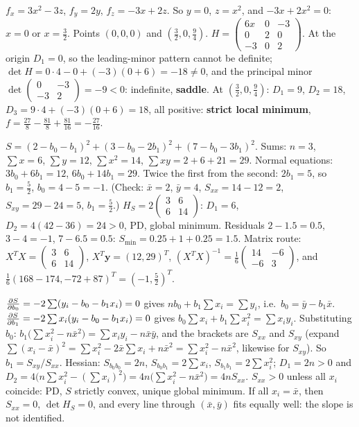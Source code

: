 \begin{solutions}
    \item $f_x = 3 x^2 - 3 z$, $f_y = 2 y$, $f_z = -3 x + 2 z$. So $y = 0$, $z = x^2$, and $-3 x + 2 x^2 = 0$: $x = 0$ or $x = \tfrac32$. Points $(0, 0, 0)$ and $(\tfrac32, 0, \tfrac94)$. $H = \begin{pmatrix} 6 x & 0 & -3 \\ 0 & 2 & 0 \\ -3 & 0 & 2 \end{pmatrix}$. At the origin $D_1 = 0$, so the leading-minor pattern cannot be definite; $\det H = 0 \cdot 4 - 0 + (-3)(0 + 6) = -18 \ne 0$, and the principal minor $\det \begin{pmatrix} 0 & -3 \\ -3 & 2 \end{pmatrix} = -9 < 0$: indefinite, \textbf{saddle}. At $(\tfrac32, 0, \tfrac94)$: $D_1 = 9$, $D_2 = 18$, $D_3 = 9 \cdot 4 + (-3)(0 + 6) = 18$, all positive: \textbf{strict local minimum}, $f = \tfrac{27}{8} - \tfrac{81}{8} + \tfrac{81}{16} = -\tfrac{27}{16}$.
    \item $S = (2 - b_0 - b_1)^2 + (3 - b_0 - 2 b_1)^2 + (7 - b_0 - 3 b_1)^2$. Sums: $n = 3$, $\sum x = 6$, $\sum y = 12$, $\sum x^2 = 14$, $\sum x y = 2 + 6 + 21 = 29$. Normal equations: $3 b_0 + 6 b_1 = 12$, $6 b_0 + 14 b_1 = 29$. Twice the first from the second: $2 b_1 = 5$, so $b_1 = \tfrac52$, $b_0 = 4 - 5 = -1$. (Check: $\bar x = 2$, $\bar y = 4$, $S_{xx} = 14 - 12 = 2$, $S_{xy} = 29 - 24 = 5$, $b_1 = \tfrac52$.) $H_S = 2 \begin{pmatrix} 3 & 6 \\ 6 & 14 \end{pmatrix}$: $D_1 = 6$, $D_2 = 4 (42 - 36) = 24 > 0$, PD, global minimum. Residuals $2 - 1.5 = 0.5$, $3 - 4 = -1$, $7 - 6.5 = 0.5$: $S_{\min} = 0.25 + 1 + 0.25 = 1.5$. Matrix route: $X^T X = \begin{pmatrix} 3 & 6 \\ 6 & 14 \end{pmatrix}$, $X^T \mathbf{y} = (12, 29)^T$, $(X^T X)^{-1} = \tfrac16 \begin{pmatrix} 14 & -6 \\ -6 & 3 \end{pmatrix}$, and $\tfrac16 (168 - 174, -72 + 87)^T = (-1, \tfrac52)^T$. \checkmark
    \item $\frac{\partial S}{\partial b_0} = -2 \sum (y_i - b_0 - b_1 x_i) = 0$ gives $n b_0 + b_1 \sum x_i = \sum y_i$, i.e.\ $b_0 = \bar y - b_1 \bar x$. $\frac{\partial S}{\partial b_1} = -2 \sum x_i (y_i - b_0 - b_1 x_i) = 0$ gives $b_0 \sum x_i + b_1 \sum x_i^2 = \sum x_i y_i$. Substituting $b_0$: $b_1 \bigl(\sum x_i^2 - n \bar x^2\bigr) = \sum x_i y_i - n \bar x \bar y$, and the brackets are $S_{xx}$ and $S_{xy}$ (expand $\sum (x_i - \bar x)^2 = \sum x_i^2 - 2 \bar x \sum x_i + n \bar x^2 = \sum x_i^2 - n \bar x^2$, likewise for $S_{xy}$). So $b_1 = S_{xy}/S_{xx}$. Hessian: $S_{b_0 b_0} = 2 n$, $S_{b_0 b_1} = 2 \sum x_i$, $S_{b_1 b_1} = 2 \sum x_i^2$; $D_1 = 2 n > 0$ and $D_2 = 4 \bigl(n \sum x_i^2 - (\sum x_i)^2\bigr) = 4 n \bigl(\sum x_i^2 - n \bar x^2\bigr) = 4 n S_{xx}$. $S_{xx} > 0$ unless all $x_i$ coincide: PD, $S$ strictly convex, unique global minimum. If all $x_i = \bar x$, then $S_{xx} = 0$, $\det H_S = 0$, and every line through $(\bar x, \bar y)$ fits equally well: the slope is not identified.

\end{solutions}
